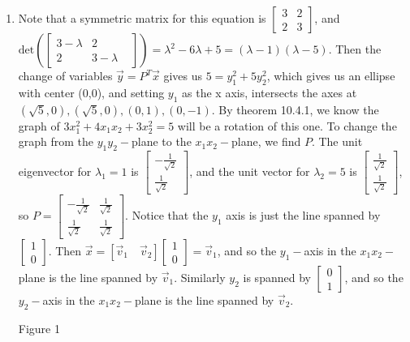 \documentclass[10pt,english]{article}
\begin{document}
\begin{enumerate}
\pagebreak
\item Note that a symmetric matrix for this equation is $\begin{bmatrix}3&2\\2&3\end{bmatrix}$, and $\text{det}\left(\begin{bmatrix}3-\lambda&2&\\2&3-\lambda\end{bmatrix}\right)=\lambda^2-6\lambda+5=(\lambda-1)(\lambda-5)$. Then the change of variables $\vec{y}=P^T\vec{x}$ gives us $5=y_1^2+5y_2^2$, which gives us an ellipse with center (0,0), and setting $y_1$ as the x axis, intersects the axes at $(\sqrt{5},0),(\sqrt{5},0),(0,1),(0,-1)$. By theorem 10.4.1, we know the graph of $3x_1^2+4x_1x_2+3x_2^2=5$ will be a rotation of this one. To change the graph from the $y_1y_2-$plane to the $x_1x_2-$plane, we find $P$. The unit eigenvector for $\lambda_1=1$ is $\begin{bmatrix}-\frac{1}{\sqrt{2}}\\\frac{1}{\sqrt{2}}\end{bmatrix}$, and the unit vector for $\lambda_2=5$ is $\begin{bmatrix}\frac{1}{\sqrt{2}}\\\frac{1}{\sqrt{2}}\end{bmatrix}$, so $P=\begin{bmatrix}-\frac{1}{\sqrt{2}}&\frac{1}{\sqrt{2}}\\\frac{1}{\sqrt{2}}&\frac{1}{\sqrt{2}}\end{bmatrix}$. Notice that the $y_1$ axis is just the line spanned by $\begin{bmatrix}1\\0\end{bmatrix}$. Then $\vec{x}=[\vec{v}_1\quad\vec{v}_2]\begin{bmatrix}1\\0\end{bmatrix}=\vec{v}_1$, and so the $y_1-$axis in the $x_1x_2-$plane is the line spanned by $\vec{v}_1$. Similarly $y_2$ is spanned by $\begin{bmatrix}0\\1\end{bmatrix}$, and so the $y_2-$axis in the $x_1x_2-$plane is the line spanned by $\vec{v}_2$. 


\pagebreak
\leavevmode\vadjust{\vspace{-\baselineskip}}\newline
{}
Figure 1



\end{enumerate}
\end{document}
